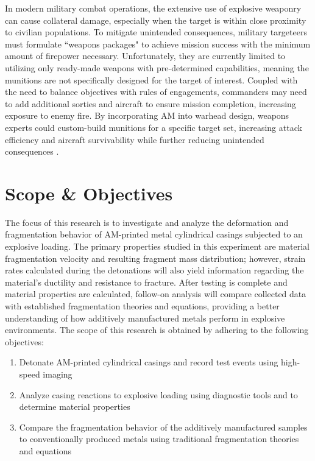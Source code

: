 In modern military combat operations, the extensive use of explosive weaponry can cause collateral damage, especially when the target is within close proximity to civilian populations. To mitigate unintended consequences, military targeteers must formulate ``weapons packages" to achieve mission success with the minimum amount of firepower necessary. Unfortunately, they are currently limited to utilizing only ready-made weapons with pre-determined capabilities, meaning the munitions are not specifically designed for the target of interest. Coupled with the need to balance objectives with rules of engagements, commanders may need to add additional sorties and aircraft to ensure mission completion, increasing exposure to enemy fire. By incorporating \gls{AM} into warhead design, weapons experts could custom-build munitions for a specific target set, increasing attack efficiency and aircraft survivability while further reducing unintended consequences \cite{SurvivabilityArticle}. 


\section{Scope \& Objectives}

The focus of this research is to investigate and analyze the deformation and fragmentation behavior of \gls{AM}-printed metal cylindrical casings subjected to an explosive loading. The primary properties studied in this experiment are material fragmentation velocity and resulting fragment mass distribution; however, strain rates calculated during the detonations will also yield information regarding the material's ductility and resistance to fracture. After testing is complete and material properties are calculated, follow-on analysis will compare collected data with established fragmentation theories and equations, providing a better understanding of how additively manufactured metals perform in explosive environments. The scope of this research is obtained by adhering to the following objectives:

\begin{enumerate}
\item Detonate \gls{AM}-printed cylindrical casings and record test events using high-speed imaging
\item Analyze casing reactions to explosive loading using diagnostic tools and to determine material properties 
\item Compare the fragmentation behavior of the additively manufactured samples to conventionally produced metals using traditional fragmentation theories and equations
\end{enumerate}

